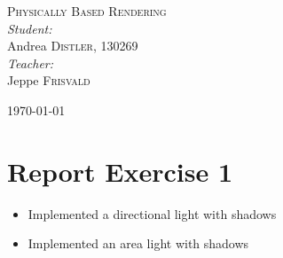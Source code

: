 \documentclass[a4paper]{article}
\begin{document}
\begin{titlepage}
\textsc{\LARGE Physically Based Rendering}\\[1.5cm]

\emph{Student:}\\
Andrea \textsc{Distler}, 130269\\[1.5cm]

\emph{Teacher:}\\
Jeppe \textsc{Frisvald}\\

\vfill

{\large \today}
\end{titlepage}

\tableofcontents
\newpage

\section{Report Exercise 1}

\begin{itemize}
\item{Implemented a directional light with shadows}
\item{Implemented an area light with shadows}
\end{itemize}
\end{document}
